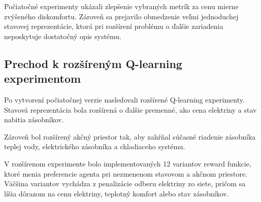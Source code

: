 \documentclass[conference]{IEEEtran}
\begin{document}
Počiatočné experimenty ukázali zlepšenie vybraných metrík za cenu mierne zvýšeného diskomfortu. Zároveň sa prejavilo obmedzenie veľmi jednoduchej stavovej reprezentácie, ktorá pri rozšírení problému o ďalšie zariadenia neposkytuje dostatočný opis systému.

\subsection{Prechod k rozšíreným Q-learning experimentom}

Po vytvorení počiatočnej verzie nasledovali rozšírené Q-learning experimenty. Stavová reprezentácia bola rozšírená o ďalšie premenné, ako cena elektriny a stav nabitia zásobníkov.

Zároveň bol rozšírený akčný priestor tak, aby zahŕňal súčasné riadenie zásobníka teplej vody, elektrického zásobníka a chladiaceho systému.

V rozšírenom experimente bolo implementovaných 12 variantov reward funkcie, ktoré menia preferencie agenta pri nezmenenom stavovom a akčnom priestore. Väčšina variantov vychádza z penalizácie odberu elektriny zo siete, pričom sa líšia dôrazom na cenu elektriny, teplotný komfort alebo stav zásobníkov.
\end{document}
